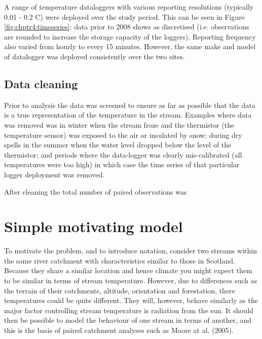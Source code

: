 A range of temperature dataloggers with various reporting resolutions (typically 0.01 - 0.2 \degrees C) were deployed over the study period. This can be seen in Figure \ref{fig:chptr4:timeseries}: data prior to 2008 shows as discretised (i.e. observations are rounded to increase the storage capacity of the loggers). Reporting frequency also varied from hourly to every 15 minutes. However, the same make and model of datalogger was deployed consistently over the two sites.




\subsection{Data cleaning}

Prior to analysis the data was screened to ensure as far as possible that the data is a true representation of the temperature in the stream.  Examples where data was removed was in winter when the stream froze and the thermistor (the temperature sensor) was exposed to the air or insulated by snow; during dry spells in the summer when the water level dropped below the level of the thermistor; and periods where the data-logger was clearly mis-calibrated (all temperatures were too high) in which case the time series of that particular logger deployment was removed. 

After cleaning the total number of paired observations was 




\section{Simple motivating model}
\label{sec:chpt4:simple}

To motivate the problem, and to introduce notation, consider two streams within the same river catchment with characteristics similar to those in Scotland. Because they share a similar location and hence climate you might expect them to be similar in terms of stream temperature. However, due to differences such as the terrain of their catchments, altitude, orientation and forestation, there temperatures could be quite different.  They will, however, behave similarly as the major factor controlling stream temperature is radiation from the sun. It should then be possible to model the behaviour of one stream in terms of another, and this is the basis of paired catchment analyses such as Moore at al. (2005). 

